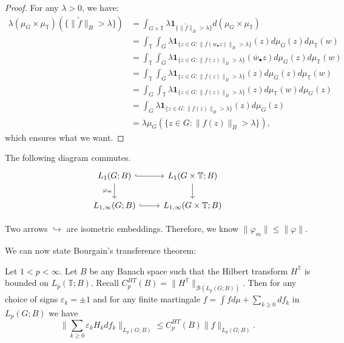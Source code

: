     \begin{proof}
        For any $\lambda>0$, we have:
            \begin{align*}
                \lambda(\mu_{G}\times\mu_{\mathbb{T}})(\{\|\widetilde{f}\|_B>\lambda\})
                  &=\int_{G\times\mathbb{T}}\lambda\mathbf{1}_{\{\|\widetilde{f}\|_B>\lambda\}}d(\mu_G\times\mu_{\mathbb{T}})
                \\&=\int_{\mathbb{T}}\int_{G}\lambda\mathbf{1}_{\{z\in G\colon\|f(w_{\bullet}z)\|_B>\lambda\}}(z)d\mu_G(z)d\mu_{\mathbb{T}}(w)
                \\&=\int_{\mathbb{T}}\int_{G}\lambda\mathbf{1}_{\{z\in G\colon \|f(z)\|_B>\lambda\}}(\overline{w}_{\bullet}z)d\mu_{G}(z)d\mu_{\mathbb{T}}(w)
                \\&=\int_{\mathbb{T}}\int_{G}\lambda\mathbf{1}_{\{z\in G\colon \|f(z)\|_B>\lambda\}}(z)d\mu_{G}(z)d\mu_{\mathbb{T}}(w)
                \\&=\int_{G}\int_{\mathbb{T}}\lambda\mathbf{1}_{\{z\in G\colon \|f(z)\|_B>\lambda\}}(z)d\mu_{\mathbb{T}}(w)d\mu_G(z)
                \\&=\int_{G}\lambda\mathbf{1}_{\{z\in G\colon \|f(z)\|_B>\lambda\}}(z)d\mu_G(z)
                \\&=\lambda\mu_{G}(\{z\in G\colon \|f(z)\|_B>\lambda\}),
            \end{align*}
        which ensures what we want.
    \end{proof}
    The following diagram commutes. 
    \[\begin{tikzcd}
        L_1(G;B) \arrow[d, "\varphi_m"'] \arrow[r, hook] & L_1(G\times\mathbb{T};B) \arrow[d]  \\
        {L_{1,\infty}(G;B)} \arrow[r, hook]              & {L_{1,\infty}(G\times\mathbb{T};B)}
    \end{tikzcd}\]

    Two arrows $\hookrightarrow$ are isometric embeddings. Therefore, we know $\|\varphi_m\| \leq \|\varphi \| $.

We can now state Bourgain’s transference theorem:
\begin{theorem}\label{thm: Bourgain trans}
    Let $1 < p < \infty$. Let $B$ be any Banach space such that the Hilbert transform $H^{\mathbb{T}}$ is 
    bounded on $L_p(\mathbb{T};B)$. Recall $C_p^{HT}(B)=\|H^{\mathbb{T}}\|_{\mathcal{B}(L_p(G;B))}$. Then for any choice of signs 
    $\varepsilon_k=\pm1$ and for any finite martingale $f=\int fd\mu+\sum_{k\geq0}df_k$ in $L_p(G;B)$ we have
        \[  \|\sum_{k\geq0}\varepsilon_k H_k df_k\|_{L_p(G;B)}\leq C_p^{HT}(B)\|f\|_{L_p(G;B)}. \]
\end{theorem}

